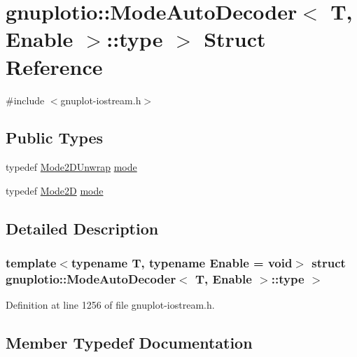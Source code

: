 \hypertarget{structgnuplotio_1_1_mode_auto_decoder_1_1type_01_4}{}\section{gnuplotio\+:\+:Mode\+Auto\+Decoder$<$ T, Enable $>$\+:\+:type $>$ Struct Reference}
\label{structgnuplotio_1_1_mode_auto_decoder_1_1type_01_4}


{\ttfamily \#include $<$gnuplot-\/iostream.\+h$>$}

\subsection*{Public Types}
\begin{DoxyCompactItemize}
\item 
typedef \hyperlink{structgnuplotio_1_1_mode2_d_unwrap}{Mode2\+D\+Unwrap} \hyperlink{structgnuplotio_1_1_mode_auto_decoder_1_1type_01_4_ad1942745c810b24503495c6ade6bd9f6}{mode}
\item 
typedef \hyperlink{structgnuplotio_1_1_mode2_d}{Mode2D} \hyperlink{structgnuplotio_1_1_mode_auto_decoder_1_1type_01_4_a07e8af1d93e8107efb7be6fd68b0024c}{mode}
\end{DoxyCompactItemize}


\subsection{Detailed Description}
\subsubsection*{template$<$typename T, typename Enable = void$>$\newline
struct gnuplotio\+::\+Mode\+Auto\+Decoder$<$ T, Enable $>$\+::type $>$}



Definition at line 1256 of file gnuplot-\/iostream.\+h.



\subsection{Member Typedef Documentation}
\mbox{\label{structgnuplotio_1_1_mode_auto_decoder_1_1type_01_4_ad1942745c810b24503495c6ade6bd9f6}} 
